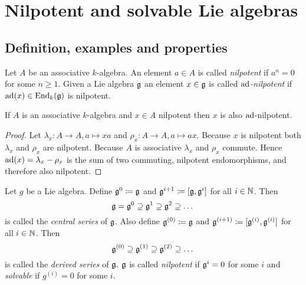 \section{Nilpotent and solvable Lie algebras}





\subsection{Definition, examples and properties}


\begin{defi}
 Let $A$ be an associative $k$-algebra. An element $a \in A$ is called \emph{nilpotent} if $a^n = 0$ for some $n \geq 1$. Given a Lie algebra $\mathfrak{g}$ an element $x \in \mathfrak{g}$ is called \emph{$\operatorname{ad}$-nilpotent} if $\operatorname{ad}(x) \in \operatorname{End}_k(\mathfrak{g})$ is nilpotent.
\end{defi}


\begin{lem}\label{lem: nilpotent implies ad-nilpotent}
 If $A$ is an associative $k$-algebra and $x \in A$ nilpotent then $x$ is also $\operatorname{ad}$-nilpotent.
\end{lem}
\begin{proof}
 Let $\lambda_x \colon A \to A, a \mapsto xa$ and $\rho_x \colon A \to A, a \mapsto ax$. Because $x$ is nilpotent both $\lambda_x$ and $\rho_x$ are nilpotent. Because $A$ is associative $\lambda_x$ and $\rho_x$ commute. Hence $\operatorname{ad}(x) = \lambda_x - \rho_x$ is the sum of two commuting, nilpotent endomorphisms, and therefore also nilpotent.
\end{proof}


\begin{defi}
 Let $g$ be a Lie algebra. Define $\mathfrak{g}^0 \coloneqq \mathfrak{g}$ and $\mathfrak{g}^{i+1} \coloneqq [\mathfrak{g},\mathfrak{g}^i]$ for all $i \in \mathbb{N}$. Then
 \[
  \mathfrak{g} = \mathfrak{g}^0 \supseteq \mathfrak{g}^1 \supseteq \mathfrak{g}^2 \supseteq \dots
 \]
 is called the \emph{central series} of $\mathfrak{g}$. Also define $\mathfrak{g}^{(0)} \coloneqq \mathfrak{g}$ and $\mathfrak{g}^{(i+1)} \coloneqq [\mathfrak{g}^{(i)},\mathfrak{g}^{(i)}]$ for all $i \in \mathbb{N}$. Then
 \[
  \mathfrak{g}^{(0)} \supseteq \mathfrak{g}^{(1)} \supseteq \mathfrak{g}^{(2)} \supseteq \dots
 \]
 is called the \emph{derived series} of $\mathfrak{g}$. $\mathfrak{g}$ is called \emph{nilpotent} if $\mathfrak{g}^i = 0$ for some $i$ and \emph{solvable} if $g^{(i)} = 0$ for some $i$.
\end{defi}


